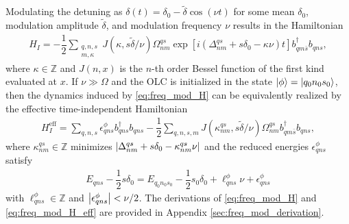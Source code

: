 \documentclass[aps,notitlepage,nofootinbib,11pt]{revtex4-1}
\renewcommand{\t}{\text} %
\newcommand{\f}[2]{\dfrac{#1}{#2}} %
\newcommand{\p}[1]{\left(#1\right)} %
\renewcommand{\sp}[1]{\left[#1\right]} %
\newcommand{\1}{\mathds{1}}
\newcommand{\Z}{\mathbb Z}
\begin{document}
Modulating the detuning as
$\delta\p{t}=\delta_0-\tilde\delta\cos\p{\nu t}$ for some mean
$\delta_0$, modulation amplitude $\tilde\delta$, and modulation
frequency $\nu$ results in the Hamiltonian
\begin{align}
  H_I
  = -\f12\sum_{\substack{q,n,s\\m,\kappa}}
  J\p{\kappa,s\tilde\delta/\nu} \Omega^{qs}_{nm}
  \exp\sp{i\p{\Delta^{qs}_{nm}+s\delta_0-\kappa\nu}t}
  b_{qm\bar s}^\dag b_{qns},
  \label{eq:freq_mod_H}
\end{align}
where $\kappa\in\Z$ and $J\p{n,x}$ is the $n$-th order Bessel function
of the first kind evaluated at $x$. If $\nu\gg\Omega$ and the OLC is
initialized in the state $\ket\phi=\ket{q_0n_0s_0}$, then the dynamics
induced by \eqref{eq:freq_mod_H} can be equivalently realized by the
effective time-independent Hamiltonian
\begin{align}
  H_I^{\t{eff}}
  = \sum_{q,n,s} \epsilon_{qns}^\phi b_{qns}^\dag b_{qns}
  - \f12\sum_{q,n,s,m} J\p{\kappa^{qs}_{nm},s\tilde\delta/\nu}
  \Omega^{qs}_{nm} b_{qm\bar s}^\dag b_{qns},
  \label{eq:freq_mod_H_eff}
\end{align}
where $\kappa^{qs}_{nm}\in\Z$ minimizes
$\abs{\Delta^{qs}_{nm}+s\delta_0-\kappa^{qs}_{nm}\nu}$ and the reduced
energies $\epsilon_{qns}^\phi$ satisfy
\begin{align}
  E_{qns} - \f12s\delta_0
  = E_{q_0n_0s_0} - \f12s_0\delta_0
  + \ell_{qns}^\phi\nu + \epsilon_{qns}^\phi
  \label{eq:reduced_E}
\end{align}
with $\ell_{qns}^\phi\in\Z$ and $\abs{\epsilon_{qns}^\phi}<\nu/2$. The
derivations of \eqref{eq:freq_mod_H} and \eqref{eq:freq_mod_H_eff} are
provided in Appendix \ref{sec:freq_mod_derivation}.
\end{document}
